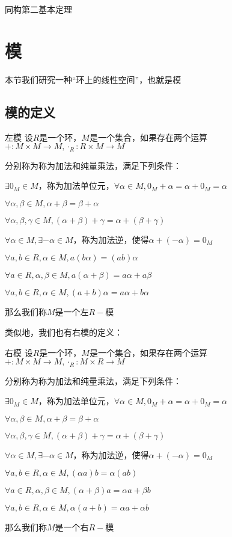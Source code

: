 \documentclass[12pt, a4paper, oneside, UTF8]{ctexbook}
\begin{document}
			\begin{them}{同构第二基本定理}{}
				
			\end{them}
	\section{模}
		本节我们研究一种“环上的线性空间”，也就是模
		\subsection{模的定义}
			\begin{defn}{左模}{}
				设$R$是一个环，$M$是一个集合，如果存在两个运算$+ : M \times M \rightarrow M,\cdot_R : R \times M \rightarrow M$
				
				分别称为称为加法和纯量乘法，满足下列条件：

				 $\exists 0_M \in M$，称为加法单位元，$\forall \alpha \in M,0_M + \alpha =\alpha +0_M=\alpha $

				 $\forall \alpha,\beta  \in M,\alpha +\beta =\beta +\alpha $

				 $\forall \alpha,\beta,\gamma  \in M,(\alpha +\beta )+\gamma =\alpha +(\beta +\gamma )$

				 $\forall \alpha \in M,\exists -\alpha \in M$，称为加法逆，使得$\alpha +(-\alpha )=0_M$

				 $\forall a,b \in R,\alpha \in M,a(b\alpha )=(ab)\alpha$

				 $\forall a \in R,\alpha ,\beta \in M,a(\alpha +\beta )=a\alpha +a\beta $

				 $\forall a,b \in R,\alpha \in M,(a+b)\alpha =a\alpha +b\alpha $

				那么我们称$M$是一个左$R-$模
			\end{defn}
			类似地，我们也有右模的定义：
			\begin{defn}{右模}{}
				设$R$是一个环，$M$是一个集合，如果存在两个运算$+ : M \times M \rightarrow M,\cdot_R : M \times R \rightarrow M$
				
				分别称为称为加法和纯量乘法，满足下列条件：

				 $\exists 0_M \in M$，称为加法单位元，$\forall \alpha \in M,0_M + \alpha =\alpha +0_M=\alpha $

				 $\forall \alpha,\beta  \in M,\alpha +\beta =\beta +\alpha $

				 $\forall \alpha,\beta,\gamma  \in M,(\alpha +\beta )+\gamma =\alpha +(\beta +\gamma )$

				 $\forall \alpha \in M,\exists -\alpha \in M$，称为加法逆，使得$\alpha +(-\alpha )=0_M$

				 $\forall a,b \in R,\alpha \in M,(\alpha a)b=\alpha (ab)$

				 $\forall a \in R,\alpha ,\beta \in M,(\alpha +\beta )a=\alpha a+\beta b$

				 $\forall a,b \in R,\alpha \in M,\alpha (a+b)=\alpha a+\alpha b$

				那么我们称$M$是一个右$R-$模
			\end{defn}
\end{document}
